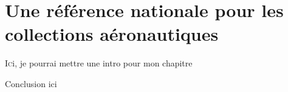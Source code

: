 \chapter[Référence nationale]{\label{I-A}Une référence nationale pour les collections aéronautiques}

\lettrine{I}ci, je pourrai mettre une intro pour mon chapitre






\bigskip
\bigskip
\bigskip

Conclusion ici
